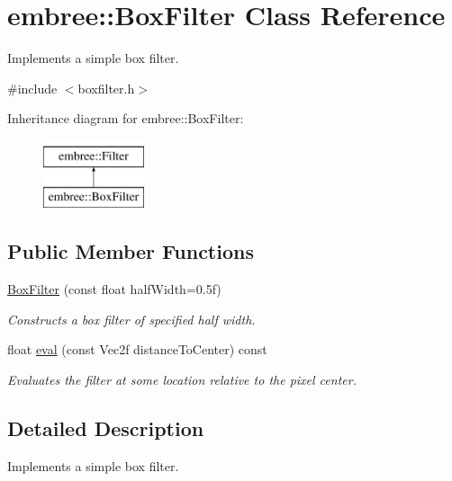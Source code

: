 \hypertarget{classembree_1_1_box_filter}{
\section{embree::BoxFilter Class Reference}
\label{classembree_1_1_box_filter}
}


Implements a simple box filter.  




{\ttfamily \#include $<$boxfilter.h$>$}

Inheritance diagram for embree::BoxFilter:\begin{figure}[H]
\begin{center}
\leavevmode
\includegraphics[height=2.000000cm]{classembree_1_1_box_filter}
\end{center}
\end{figure}
\subsection*{Public Member Functions}
\begin{DoxyCompactItemize}
\item 
\hyperlink{classembree_1_1_box_filter_adf13faac545f407f8763499a2f6c79c6}{BoxFilter} (const float halfWidth=0.5f)
\begin{DoxyCompactList}\small\item\em Constructs a box filter of specified half width. \item\end{DoxyCompactList}\item 
float \hyperlink{classembree_1_1_box_filter_af91c351f0b286d9dde2f20a75d206012}{eval} (const Vec2f distanceToCenter) const 
\begin{DoxyCompactList}\small\item\em Evaluates the filter at some location relative to the pixel center. \item\end{DoxyCompactList}\end{DoxyCompactItemize}


\subsection{Detailed Description}
Implements a simple box filter. 

